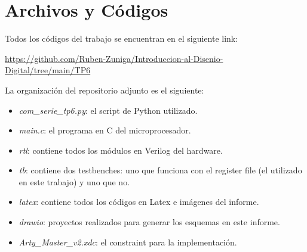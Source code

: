 \newpage
\appendix

\section{Archivos y Códigos} \label{appx:archivos}

Todos los códigos del trabajo se encuentran en el siguiente link:

\noindent
\url{https://github.com/Ruben-Zuniga/Introduccion-al-Disenio-Digital/tree/main/TP6}

La organización del repositorio adjunto es el siguiente:

\begin{itemize}
    \item \emph{com\_serie\_tp6.py}: el script de Python utilizado.
    \item \emph{main.c}: el programa en C del microprocesador.
    \item \emph{rtl}: contiene todos los módulos en Verilog del hardware.
    \item \emph{tb}: contiene dos testbenches: uno que funciona con el register file (el utilizado en este trabajo) y uno que no.
    \item \emph{latex}: contiene todos los códigos en Latex e imágenes del informe.
    \item \emph{drawio}: proyectos realizados para generar los esquemas en este informe.
    \item \emph{Arty\_Master\_v2.xdc}: el constraint para la implementación.
\end{itemize}


%
%


